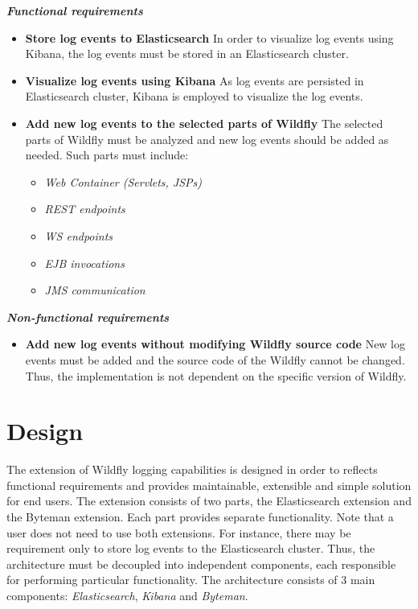 \documentclass[12pt,oneside]{fithesis2}
\begin{document}
\noindent
\newline
\textit{\textbf{Functional requirements}}
\begin{itemize}
	\item \textbf{Store log events to Elasticsearch} \newline
	In order to visualize log events using Kibana, the log events must be stored in an Elasticsearch cluster.
	\item \textbf{Visualize log events using Kibana} \newline
	As log events are persisted in Elasticsearch cluster, Kibana is employed to visualize the log events.
	\item \textbf{Add new log events to the selected parts of Wildfly}  \newline
	The selected parts of Wildfly must be analyzed and new log events should be added as needed. Such parts must include:
	 \begin{itemize}
	 	\item \textit{Web Container (Servlets, JSPs)}
	 	\item \textit{REST endpoints}
	 	\item \textit{WS endpoints}
	 	\item \textit{EJB invocations}
	 	\item \textit{JMS communication}
	 \end{itemize}
\end{itemize}

\noindent
\textit{\textbf{Non-functional requirements}}
\begin{itemize}
	\item \textbf{Add new log events without modifying Wildfly source code} \newline
	New log events must be added and the source code of the Wildfly cannot be changed. Thus, the implementation is not dependent on the specific version of Wildfly.
\end{itemize}

\section{Design}
The extension of Wildfly logging capabilities is designed in order to reflects functional requirements and provides maintainable, extensible and simple solution for end users. The extension consists of two parts, the Elasticsearch extension and the Byteman extension. Each part provides separate functionality. Note that a user does not need to use both extensions. For instance, there may be requirement only to store log events to the Elasticsearch cluster. Thus, the architecture must be decoupled into independent components, each responsible for performing particular functionality. The architecture consists of 3 main components: \textit{Elasticsearch}, \textit{Kibana} and \textit{Byteman}.
\end{document}
